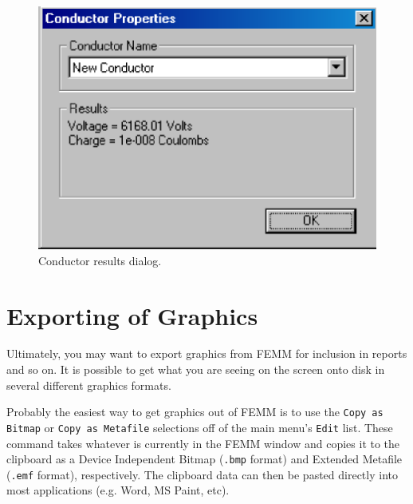 \documentclass[12pt]{report}
\begin{document}
\begin{figure}[htbp]
\centerline{\includegraphics{belaman21.eps}}
\caption{Conductor results dialog.}
\label{fig21}
\end{figure}









\section{Exporting of Graphics}

Ultimately, you may want to export graphics from FEMM for inclusion
in reports and so on. It is possible to get what you are seeing on
the screen onto disk in several different graphics formats.

Probably the easiest way to get graphics out of FEMM is to use the
\texttt{Copy as Bitmap} or \texttt{Copy as Metafile} selections off of the
main menu's \texttt{Edit} list. These command takes whatever is
currently in the FEMM window and copies it to the clipboard as a
Device Independent Bitmap (\texttt{.bmp} format) and Extended
Metafile (\texttt{.emf} format), respectively. The clipboard data
can then be pasted directly into most applications (e.g. Word, MS
Paint, etc).
\end{document}
